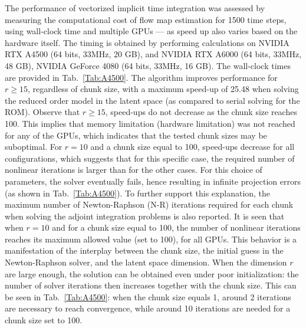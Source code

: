 The performance of vectorized implicit time integration was assessed by measuring the  computational cost of flow map estimation for 1500 time steps, using wall-clock time and multiple GPUs --- as speed up also varies based on the hardware itself. The timing is obtained by performing calculations on NVIDIA RTX A4500 (64 bits, 33MHz, 20 GB), and NVIDIA RTX A6000 (64 bits, 33MHz, 48 GB), NVIDIA GeForce 4080 (64 bits, 33MHz, 16 GB). The wall-clock times are provided in Tab.~\ref{Tab:A4500}. The algorithm improves performance for $r \geq 15$, regardless of chunk size, with a maximum speed-up of 25.48 when solving the reduced order model in the latent space (as compared to serial solving for the ROM). Observe that $r \geq 15$, speed-ups do not decrease as the chunk size reaches 100. This implies that memory limitation (hardware limitation) was not reached for any of the GPUs, which indicates that the tested chunk sizes may be suboptimal. For $r = 10$ and a chunk size equal to 100, speed-ups decrease for all configurations, which suggests that for this specific case, the required number of nonlinear iterations is larger than for the other cases. For this choice of parameters, the solver eventually fails, hence resulting in infinite projection errors (as shown in Tab.~\ref{Tab:A4500}). To further support this explanation, the maximum number of Newton-Raphson (N-R) iterations required for each chunk when solving the adjoint integration problems is also reported. It is seen that when $r = 10$ and for a chunk size equal to 100, the number of nonlinear iterations reaches its maximum allowed value (set to 100), for all GPUs. This behavior is a manifestation of the interplay between the chunk size, the initial guess in the Newton-Raphson solver, and the latent space dimension. When the dimension $r$ are large enough, the solution can be obtained even under poor initialization: the number of solver iterations then increases together with the chunk size. This can be seen in Tab.~\ref{Tab:A4500}: when the chunk size equals 1, around 2 iterations are necessary to reach convergence, while around 10 iterations are needed for a chunk size set to 100.
